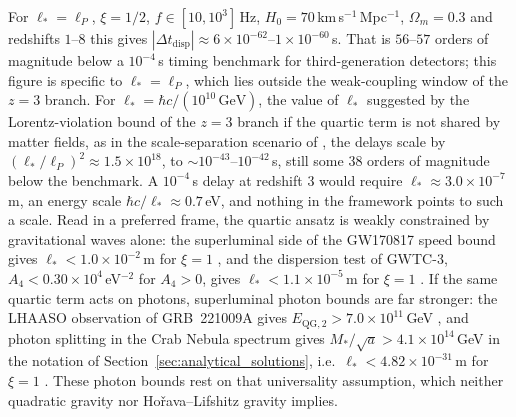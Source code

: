 \documentclass[11pt,a4paper,reqno]{amsart}
\theoremstyle{definition}
\numberwithin{equation}{section}
\begin{document}
For $\ell_\ast = \ell_P$, $\xi = 1/2$, $f \in [10, 10^3]$\,Hz, $H_0 = 70$\,km\,s$^{-1}$\,Mpc$^{-1}$, $\Omega_m = 0.3$ and redshifts $1$--$8$ this gives $|\Delta t_{\mathrm{disp}}| \approx 6 \times 10^{-62}$--$1 \times 10^{-60}$\,s. That is $56$--$57$ orders of magnitude below a $10^{-4}$\,s timing benchmark for third-generation detectors; this figure is specific to $\ell_\ast = \ell_P$, which lies outside the weak-coupling window of the $z = 3$ branch. For $\ell_\ast = \hbar c/(10^{10}\,\mathrm{GeV})$, the value of $\ell_\ast$ suggested by the Lorentz-violation bound of the $z = 3$ branch if the quartic term is not shared by matter fields, as in the scale-separation scenario of \cite{pospelov2012lorentz}, the delays scale by $(\ell_\ast/\ell_P)^2 \approx 1.5 \times 10^{18}$, to $\sim 10^{-43}$--$10^{-42}$\,s, still some $38$ orders of magnitude below the benchmark. A $10^{-4}$\,s delay at redshift $3$ would require $\ell_\ast \approx 3.0 \times 10^{-7}$\,m, an energy scale $\hbar c/\ell_\ast \approx 0.7$\,eV, and nothing in the framework points to such a scale. Read in a preferred frame, the quartic ansatz is weakly constrained by gravitational waves alone: the superluminal side of the GW170817 speed bound gives $\ell_\ast < 1.0 \times 10^{-2}$\,m for $\xi = 1$ \cite{abbott2017gravitational}, and the dispersion test of GWTC-3, $A_4 < 0.30 \times 10^4$\,eV$^{-2}$ for $A_4 > 0$, gives $\ell_\ast < 1.1 \times 10^{-5}$\,m for $\xi = 1$ \cite{gwtc3tgr}. If the same quartic term acts on photons, superluminal photon bounds are far stronger: the LHAASO observation of GRB~221009A gives $E_{\mathrm{QG},2} > 7.0 \times 10^{11}$\,GeV \cite{lhaaso2024}, and photon splitting in the Crab Nebula spectrum gives $M_\ast/\sqrt{a} > 4.1 \times 10^{14}$\,GeV in the notation of Section~\ref{sec:analytical_solutions}, i.e.\ $\ell_\ast < 4.82 \times 10^{-31}$\,m for $\xi = 1$ \cite{satunin2019}. These photon bounds rest on that universality assumption, which neither quadratic gravity nor Ho\v{r}ava--Lifshitz gravity implies.
\end{document}
